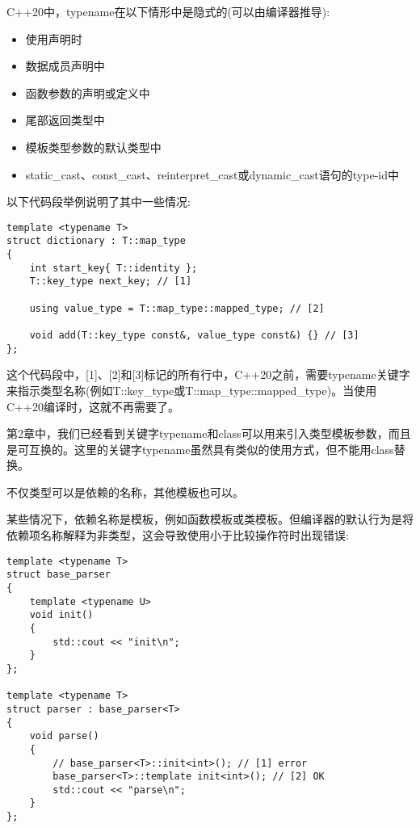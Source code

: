 C++20中，typename在以下情形中是隐式的(可以由编译器推导):

\begin{itemize}
\item
使用声明时

\item
数据成员声明中

\item
函数参数的声明或定义中

\item
尾部返回类型中

\item
模板类型参数的默认类型中

\item
static\_cast、const\_cast、reinterpret\_cast或dynamic\_cast语句的type-id中
\end{itemize}

以下代码段举例说明了其中一些情况:

\begin{lstlisting}[style=styleCXX]
template <typename T>
struct dictionary : T::map_type
{
	int start_key{ T::identity };
	T::key_type next_key; // [1]

	using value_type = T::map_type::mapped_type; // [2]

	void add(T::key_type const&, value_type const&) {} // [3]
};
\end{lstlisting}

这个代码段中，[1]、[2]和[3]标记的所有行中，C++20之前，需要typename关键字来指示类型名称(例如T::key\_type或T::map\_type::mapped\_type)。当使用C++20编译时，这就不再需要了。

\begin{tcolorbox}[breakable,enhanced jigsaw,colback=blue!5!white,colframe=blue!75!black,title={Note}]
第2章中，我们已经看到关键字typename和class可以用来引入类型模板参数，而且是可互换的。这里的关键字typename虽然具有类似的使用方式，但不能用class替换。
\end{tcolorbox}

不仅类型可以是依赖的名称，其他模板也可以。


某些情况下，依赖名称是模板，例如函数模板或类模板。但编译器的默认行为是将依赖项名称解释为非类型，这会导致使用小于比较操作符时出现错误:

\begin{lstlisting}[style=styleCXX]
template <typename T>
struct base_parser
{
	template <typename U>
	void init()
	{
		std::cout << "init\n";
	}
};

template <typename T>
struct parser : base_parser<T>
{
	void parse()
	{
		// base_parser<T>::init<int>(); // [1] error
		base_parser<T>::template init<int>(); // [2] OK
		std::cout << "parse\n";
	}
};
\end{lstlisting}

